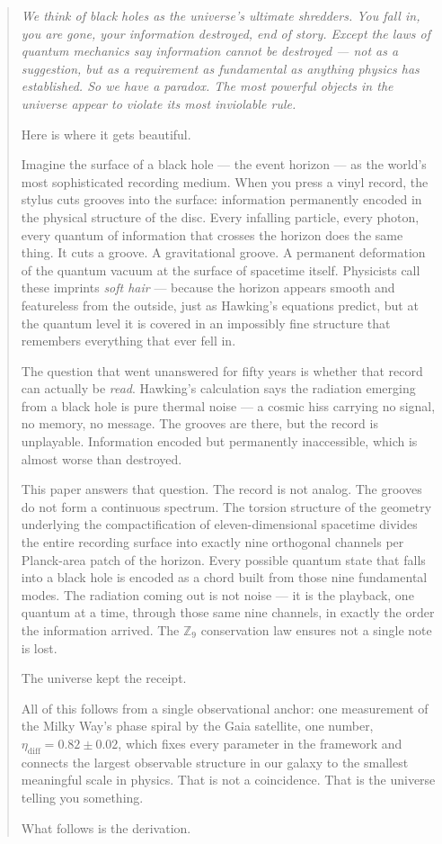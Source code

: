 \documentclass[11pt,a4paper]{article}
\begin{document}
\begin{quote}
\itshape
We think of black holes as the universe's ultimate shredders. You fall in,
you are gone, your information destroyed, end of story. Except the laws of
quantum mechanics say information cannot be destroyed --- not as a suggestion,
but as a requirement as fundamental as anything physics has established. So
we have a paradox. The most powerful objects in the universe appear to
violate its most inviolable rule.

Here is where it gets beautiful.

Imagine the surface of a black hole --- the event horizon --- as the world's
most sophisticated recording medium. When you press a vinyl record, the stylus
cuts grooves into the surface: information permanently encoded in the physical
structure of the disc. Every infalling particle, every photon, every quantum of
information that crosses the horizon does the same thing. It cuts a groove. A
gravitational groove. A permanent deformation of the quantum vacuum at the
surface of spacetime itself. Physicists call these imprints \emph{soft hair} ---
because the horizon appears smooth and featureless from the outside, just as
Hawking's equations predict, but at the quantum level it is covered in an
impossibly fine structure that remembers everything that ever fell in.

The question that went unanswered for fifty years is whether that record can
actually be \emph{read}. Hawking's calculation says the radiation emerging from
a black hole is pure thermal noise --- a cosmic hiss carrying no signal, no
memory, no message. The grooves are there, but the record is unplayable.
Information encoded but permanently inaccessible, which is almost worse than
destroyed.

This paper answers that question. The record is not analog. The grooves do not
form a continuous spectrum. The torsion structure of the geometry underlying
the compactification of eleven-dimensional spacetime divides the entire
recording surface into exactly nine orthogonal channels per Planck-area patch
of the horizon. Every possible quantum state that falls into a black hole is
encoded as a chord built from those nine fundamental modes. The radiation coming
out is not noise --- it is the playback, one quantum at a time, through those
same nine channels, in exactly the order the information arrived. The
$\mathbb{Z}_9$ conservation law ensures not a single note is lost.

The universe kept the receipt.

All of this follows from a single observational anchor: one measurement of the
Milky Way's phase spiral by the Gaia satellite, one number,
$\eta_{\mathrm{diff}} = 0.82 \pm 0.02$, which fixes every parameter in the
framework and connects the largest observable structure in our galaxy to the
smallest meaningful scale in physics. That is not a coincidence. That is the
universe telling you something.

What follows is the derivation.
\end{quote}
\end{document}
